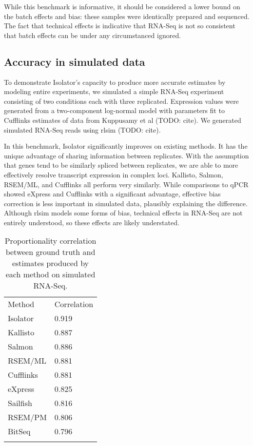 \documentclass[twocolumn]{article}
\begin{document}
While this benchmark is informative, it should be considered a lower
bound on the batch effects and bias: these samples were identically
prepared and sequenced. The fact that technical effects is indicative
that RNA-Seq is not so consistent that batch effects can be under any
circumstanced ignored.

\subsection{Accuracy in simulated
data}\label{accuracy-in-simulated-data}

To demonstrate Isolator's capacity to produce more accurate estimates by
modeling entire experiments, we simulated a simple RNA-Seq experiment
consisting of two conditions each with three replicated. Expression
values were generated from a two-component log-normal model with
parameters fit to Cufflinks estimates of data from Kuppusamy et al
(TODO: cite). We generated simulated RNA-Seq reads using rlsim (TODO:
cite).

In this benchmark, Isolator significantly improves on existing methods.
It has the unique advantage of sharing information between replicates.
With the assumption that genes tend to be similarly spliced between
replicates, we are able to more effectively resolve transcript
expression in complex loci. Kallisto, Salmon, RSEM/ML, and Cufflinks all
perform very similarly. While comparisons to qPCR showed eXpress and
Cufflinks with a significant advantage, effective bias correction is
less important in simulated data, plausibly explaining the difference.
Although rlsim models some forms of bias, technical effects in RNA-Seq
are not entirely understood, so these effects are likely understated.

\begin{table}\begin{tabular}[c]{@{}ll@{}}
\toprule\addlinespace
Method & Correlation
\\\addlinespace
\midrule
Isolator & 0.919
\\\addlinespace
Kallisto & 0.887
\\\addlinespace
Salmon & 0.886
\\\addlinespace
RSEM/ML & 0.881
\\\addlinespace
Cufflinks & 0.881
\\\addlinespace
eXpress & 0.825
\\\addlinespace
Sailfish & 0.816
\\\addlinespace
RSEM/PM & 0.806
\\\addlinespace
BitSeq & 0.796
\\\addlinespace
\bottomrule
\addlinespace
\end{tabular}
\caption{Proportionality correlation between ground truth and estimates
produced by each method on simulated RNA-Seq.}
\end{table}
\end{document}
